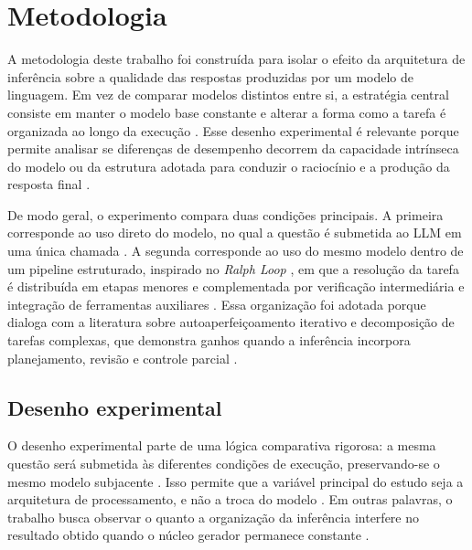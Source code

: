\documentclass[a4paper,10pt,twocolumn]{article}
\begin{document}

\section{Metodologia}

A metodologia deste trabalho foi construída para isolar o efeito da arquitetura de inferência sobre a qualidade das respostas produzidas por um modelo de linguagem. Em vez de comparar modelos distintos entre si, a estratégia central consiste em manter o modelo base constante e alterar a forma como a tarefa é organizada ao longo da execução \cite{zhang2024enhancing,liu2025beyond}. Esse desenho experimental é relevante porque permite analisar se diferenças de desempenho decorrem da capacidade intrínseca do modelo ou da estrutura adotada para conduzir o raciocínio e a produção da resposta final \cite{openai2023gpt4,huttula2025advanced}.

De modo geral, o experimento compara duas condições principais. A primeira corresponde ao uso direto do modelo, no qual a questão é submetida ao LLM em uma única chamada \cite{kojima2022large}. A segunda corresponde ao uso do mesmo modelo dentro de um pipeline estruturado, inspirado no \textit{Ralph Loop} \cite{ghuntley2025ralph}, em que a resolução da tarefa é distribuída em etapas menores e complementada por verificação intermediária e integração de ferramentas auxiliares \cite{mcp_multiagent2025,sarkar2025mcp}. Essa organização foi adotada porque dialoga com a literatura sobre autoaperfeiçoamento iterativo e decomposição de tarefas complexas, que demonstra ganhos quando a inferência incorpora planejamento, revisão e controle parcial \cite{shinn2023reflexion,madaan2023selfrefine,wang2023selfconsistency}.

\subsection{Desenho experimental}

O desenho experimental parte de uma lógica comparativa rigorosa: a mesma questão será submetida às diferentes condições de execução, preservando-se o mesmo modelo subjacente \cite{hendrycks2021measuring,rein2023gpqa}. Isso permite que a variável principal do estudo seja a arquitetura de processamento, e não a troca do modelo \cite{zhang2024enhancing}. Em outras palavras, o trabalho busca observar o quanto a organização da inferência interfere no resultado obtido quando o núcleo gerador permanece constante \cite{huttula2025advanced,liu2025beyond}.
\end{document}
